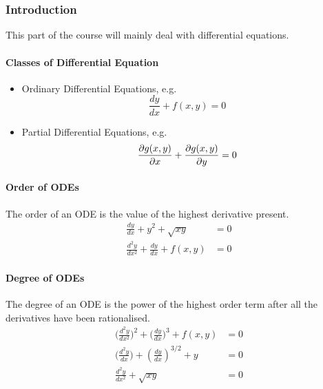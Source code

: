 \documentclass[Maths.tex]{subfiles}
\begin{document}
\part{}
\chapter{}
\section{Introduction}
This part of the course will mainly deal with differential equations.
\subsection{Classes of Differential Equation}
\begin{itemize}
    \item Ordinary Differential Equations, e.g.
        \begin{equation*}
            \frac{dy}{dx} + f(x, y) = 0
        \end{equation*}
    \item Partial Differential Equations, e.g.
        \begin{equation*}
            \frac{\partial g(x, y)}{\partial x} + \frac{\partial g(x, y)}{\partial y} = 0
        \end{equation*}
\end{itemize}

\subsection{Order of ODEs}
The order of an ODE is the value of the highest derivative present.
\begin{align}
    \frac{dy}{dx} + y^2 + \sqrt{xy} &= 0 \tag{1st Order} \\
    \frac{d^2y}{dx^2} + \frac{dy}{dx} + f(x, y) &= 0 \tag{2nd Order}
\end{align}

\subsection{Degree of ODEs}
The degree of an ODE is the power of the highest order term after all the derivatives have been rationalised.
\begin{align}
    \bigg(\frac{d^2y}{dx^2}\bigg)^2 + \bigg(\frac{dy}{dx}\bigg)^3 + f(x, y) &= 0 \tag{2nd Degree} \\
    \bigg(\frac{d^2y}{dx}\bigg) + \left(\frac{dy}{dx}\right)^{3/2} + y &= 0 \tag{4th Degree} \\
    \frac{d^2y}{dx^2} + \sqrt{xy} &= 0 \tag{2nd Degree}
\end{align}
\end{document}
